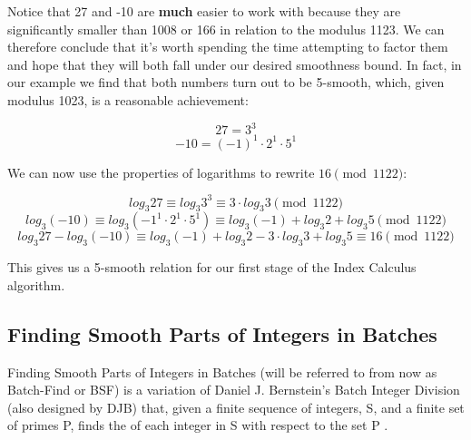 \documentclass{article}
\begin{document}
        Notice that 27 and -10 are \textbf{much} easier to work with because they are significantly smaller than 1008 or 166 in relation to the modulus 1123. We can therefore conclude that it's worth spending the time attempting to factor them and hope that they will both fall under our desired smoothness bound. In fact, in our example we find that both numbers turn out to be 5-smooth, which, given modulus 1023, is a reasonable achievement:

        $$27 = 3^3$$
        $$-10 = (-1)^1 \cdot 2^1 \cdot 5^1$$

        We can now use the properties of logarithms to rewrite $16 \pmod{1122}$:

        $$log_3 27 \equiv log_3 3^3 \equiv 3 \cdot log_3 3 \pmod{1122}$$
        $$log_3 (-10) \equiv log_3(-1^1 \cdot 2^1 \cdot 5^1) \equiv log_3(-1) + log_3 2 + log_3 5 \pmod{1122}$$
        $$log_3 27 - log_3 (-10) \equiv log_3(-1) + log_3 2 - 3 \cdot log_3 3 + log_3 5 \equiv 16 \pmod{1122}$$

        This gives us a 5-smooth relation for our first stage of the Index Calculus algorithm.

        \subsection{Finding Smooth Parts of Integers in Batches}

        Finding Smooth Parts of Integers in Batches (will be referred to from now as Batch-Find or BSF) is a variation of Daniel J. Bernstein's Batch Integer Division (also designed by DJB) that, given a finite sequence of integers, S, and a finite set of primes P, finds the of each integer in S with respect to the set P \autocite{Bernstein2004}.
\end{document}
